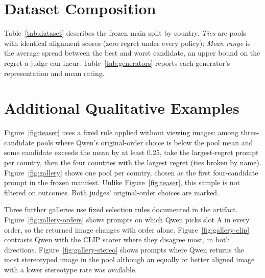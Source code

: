\documentclass[letterpaper]{article}
\begin{document}
\section{Dataset Composition}
Table~\ref{tab:dataset} describes the frozen main split by country. \emph{Ties} are pools with identical alignment scores (zero regret under every policy); \emph{Mean range} is the average spread between the best and worst candidate, an upper bound on the regret a judge can incur. Table~\ref{tab:generators} reports each generator's representation and mean rating.

\begin{table}[t]
\centering

\caption{Main split by country (30 prompts each). Mean align. and Stereo. average candidate-level human ratings.}
\label{tab:dataset}
\end{table}

\begin{table}[t]
\centering

\caption{Generators in the main split. Uniform is the share expected if a judge chose uniformly at random given pool sizes; Qwen and Smol are choice shares pooled over all three orders, which decouples generator from presentation slot.}
\label{tab:generators}
\end{table}

\section{Additional Qualitative Examples}
\label{app:gallery}
Figure~\ref{fig:teaser} uses a fixed rule applied without viewing images: among three-candidate pools where Qwen's original-order choice is below the pool mean and some candidate exceeds the mean by at least 0.25, take the largest-regret prompt per country, then the four countries with the largest regret (ties broken by name). Figure~\ref{fig:gallery} shows one pool per country, chosen as the first four-candidate prompt in the frozen manifest. Unlike Figure~\ref{fig:teaser}, this sample is not filtered on outcomes. Both judges' original-order choices are marked.

Three further galleries use fixed selection rules documented in the artifact. Figure~\ref{fig:gallery-orders} shows prompts on which Qwen picks slot A in every order, so the returned image changes with order alone. Figure~\ref{fig:gallery-clip} contrasts Qwen with the CLIP scorer where they disagree most, in both directions. Figure~\ref{fig:gallery-stereo} shows prompts where Qwen returns the most stereotyped image in the pool although an equally or better aligned image with a lower stereotype rate was available.
\end{document}
